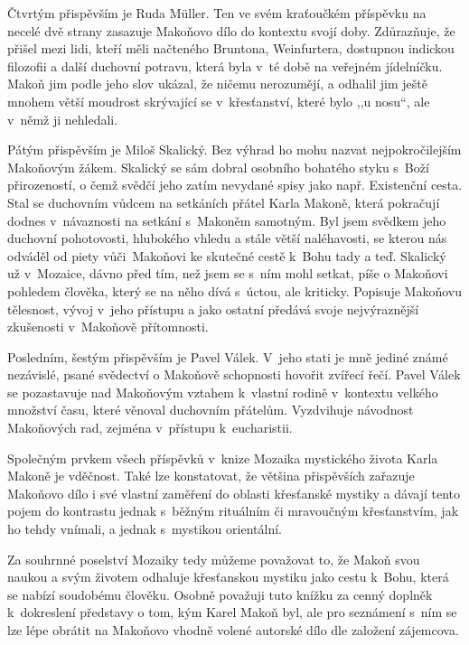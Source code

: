 Čtvrtým přispěvším je Ruda Müller. Ten ve svém kraťoučkém příspěvku na necelé
dvě strany zasazuje Makoňovo dílo do kontextu svojí doby. Zdůrazňuje, že přišel
mezi lidi, kteří měli načteného Bruntona\cite{brunton1951hidden},
Weinfurtera\cite{weinfurter1923ohnivy}, dostupnou indickou
filozofii\cite{weinfurter1935bhagavadgita} a další duchovní potravu, která byla v~té době na veřejném jídelníčku.
Makoň jim podle jeho slov ukázal, že ničemu nerozumějí, a odhalil jim ještě
mnohem větší moudrost skrývající se v~křesťanství, které bylo ,,u nosu``, ale
v~němž ji nehledali.

Pátým přispěvším je Miloš Skalický. Bez výhrad ho mohu nazvat nejpokročilejším
Makoňovým žákem. Skalický se sám dobral osobního bohatého styku s~Boží
přirozeností, o čemž svědčí jeho zatím nevydané spisy jako např. Existenční
cesta. Stal se duchovním vůdcem na setkáních přátel Karla Makoně, která
pokračují dodnes v~návaznosti na setkání s~Makoněm samotným. Byl jsem svědkem
jeho duchovní pohotovosti, hlubokého vhledu a stále větší naléhavosti, se kterou
nás odváděl od piety vůči~Makoňovi ke skutečné cestě k~Bohu tady a teď. Skalický už
v~Mozaice, dávno před tím, než jsem se s~ním mohl setkat, píše o Makoňovi
pohledem člověka, který se na něho dívá s~úctou, ale kriticky. Popisuje Makoňovu
tělesnost, vývoj v~jeho přístupu a jako ostatní předává svoje nejvýraznější
zkušenosti v~Makoňově přítomnosti.

Posledním, šestým přispěvším je Pavel Válek. V~jeho stati je mně jediné známé
nezávislé, psané svědectví o Makoňově schopnosti hovořit zvířecí řečí. Pavel
Válek se pozastavuje nad Makoňovým vztahem k~vlastní rodině v~kontextu velkého
množství času, které věnoval duchovním přátelům. Vyzdvihuje návodnost Makoňových
rad, zejména v~přístupu k~eucharistii.

Společným prvkem všech příspěvků v~knize Mozaika mystického života Karla Makoně
je vděčnost. Také lze konstatovat, že většina přispěvších zařazuje Makoňovo dílo
i své vlastní zaměření do oblasti křesťanské mystiky a dávají tento pojem do
kontrastu jednak s~běžným rituálním či mravoučným křesťanstvím, jak ho tehdy
vnímali, a jednak s~mystikou orientální.

Za souhrnné poselství Mozaiky tedy můžeme považovat to, že Makoň svou naukou a
svým životem odhaluje křesťanskou mystiku jako cestu k~Bohu, která se nabízí
soudobému člověku. Osobně považuji tuto knížku za cenný doplněk k~dokreslení
představy o tom, kým Karel Makoň byl, ale pro seznámení s~ním se lze lépe
obrátit na Makoňovo vhodně volené autorské dílo dle založení zájemcova.


